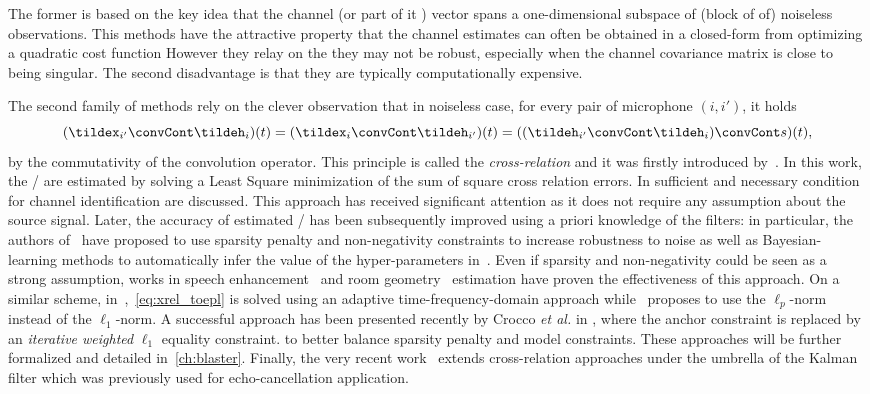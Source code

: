 The former is based on the key idea that the channel (or part of it ) vector spans a one-dimensional subspace of (block of of) noiseless observations.
This methods have the attractive property that the channel estimates can often be obtained in a closed-form from optimizing a quadratic cost function
However they relay on the they may not be robust, especially when the channel covariance matrix is close to being singular.
The second disadvantage is that they are typically computationally expensive.

The second family of methods rely on the clever observation that in noiseless case, for every pair of microphone $(i, i')$, it holds
\begin{equation}
    (\tildex_{i'} \convCont \tildeh_i)(t) = (\tildex_{i} \convCont \tildeh_{i'})(t) =  ((\tildeh_{i'} \convCont \tildeh_i) \convCont s)(t)
    ,
\end{equation}
by the commutativity of the convolution operator.
This principle is called the \textit{cross-relation} and it was firstly introduced by~.
In this work, the \RIR/ are estimated by solving a Least Square minimization of the sum of square cross relation errors.
In  sufficient and necessary condition for channel identification are discussed.
This approach has received significant attention as it does not require any assumption about the source signal.
Later, the accuracy of estimated \RIRs/ has been subsequently improved using a priori knowledge of the filters:
in particular, the authors of~ have proposed to use sparsity penalty and non-negativity constraints to increase robustness to noise as well as Bayesian-learning methods to automatically infer the value of the hyper-parameters in~.
Even if sparsity and non-negativity could be seen as a strong assumption, works in speech enhancement~ and room geometry~ estimation have proven the effectiveness of this approach.
On a similar scheme, in~,~\eqref{eq:xrel_toepl} is solved using an adaptive time-frequency-domain approach while~ proposes to use the $\ell_p$-norm instead of the $\ell_1$-norm.
A successful approach has been presented recently by Crocco \textit{et al.} in , where the anchor constraint is replaced by an \textit{iterative weighted} $\ell_1$ equality constraint.
to better balance sparsity penalty and model constraints.
These approaches will be further formalized and detailed in~\cref{ch:blaster}.
Finally, the very recent work~ extends cross-relation approaches under the umbrella of the Kalman filter which was previously used for echo-cancellation application.


